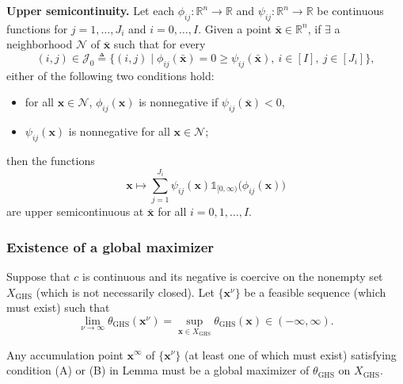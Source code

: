 \documentclass[aspectratio=169,xcolor=dvipsnames]{beamer}
\begin{document}
\begin{frame}
  \footnotesize
  \setlength{\abovedisplayskip}{4pt}
  \setlength{\belowdisplayskip}{4pt}
  \setlength{\abovedisplayshortskip}{3pt}
  \setlength{\belowdisplayshortskip}{3pt}

  \textbf{Upper semicontinuity.} Let each
  $\phi_{ij}:\mathbb{R}^n\to\mathbb{R}$ and
  $\psi_{ij}:\mathbb{R}^n\to\mathbb{R}$ be continuous functions for
  $j=1,\ldots,J_i$ and $i=0,\ldots,I$. Given a point
  $\bar{\mathbf{x}}\in\mathbb{R}^n$, if $\exists$ a neighborhood
  $\mathcal{N}$ of $\bar{\mathbf{x}}$ such that for every
  \[
    (i,j)\in\mathcal{J}_0\triangleq\bigl\{(i,j)\mid
      \phi_{ij}(\bar{\mathbf{x}})=0\geq\psi_{ij}(\bar{\mathbf{x}}),\
      i\in[I],\ j\in[J_i]\bigr\},
  \]
  either of the following two conditions hold:
  \begin{itemize}
    \setlength{\itemsep}{0.03cm}
    \item[(A)] for all $\mathbf{x}\in\mathcal{N}$, $\phi_{ij}(\mathbf{x})$ is
      nonnegative if $\psi_{ij}(\bar{\mathbf{x}})<0$,
    \item[(B)] $\psi_{ij}(\mathbf{x})$ is nonnegative for all
      $\mathbf{x}\in\mathcal{N}$;
  \end{itemize}
  then the functions
  \[
    \mathbf{x}\mapsto\sum_{j=1}^{J_i}\psi_{ij}(\mathbf{x})
      \mathds{1}_{[0,\infty)}\bigl(\phi_{ij}(\mathbf{x})\bigr)
  \]
  are upper semicontinuous at $\bar{\mathbf{x}}$ for all $i=0,1,\ldots,I$.
\end{frame}

\begin{frame}
  \frametitle{Existence of a global maximizer}
  \small
  \setlength{\abovedisplayskip}{5pt}
  \setlength{\belowdisplayskip}{5pt}

  Suppose that $c$ is continuous and its negative is coercive on the nonempty
  set $X_{\mathrm{GHS}}$ (which is not necessarily closed). Let
  $\{\mathbf{x}^\nu\}$ be a feasible sequence (which must exist) such that
  \[
    \lim_{\nu\to\infty}\theta_{\mathrm{GHS}}(\mathbf{x}^\nu)
    =\sup_{\mathbf{x}\in X_{\mathrm{GHS}}}\theta_{\mathrm{GHS}}(\mathbf{x})
    \in(-\infty,\infty). \tag{4}
  \]

  \vspace{0.06cm}
  Any accumulation point $\mathbf{x}^\infty$ of $\{\mathbf{x}^\nu\}$ (at least
  one of which must exist) satisfying condition (A) or (B) in Lemma must be a
  global maximizer of $\theta_{\mathrm{GHS}}$ on $X_{\mathrm{GHS}}$.
\end{frame}
\end{document}
